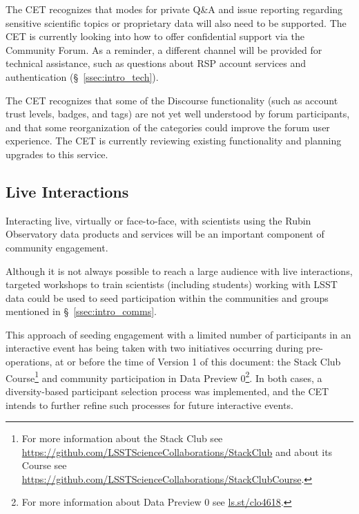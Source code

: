 \documentclass[DM,lsstdraft,toc]{lsstdoc}
\begin{document}
The CET recognizes that modes for private Q\&A and issue reporting regarding sensitive scientific topics or proprietary data will also need to be supported.
The CET is currently looking into how to offer confidential support via the Community Forum.
As a reminder, a different channel will be provided for technical assistance, such as questions about RSP account services and authentication (\S~\ref{ssec:intro_tech}).

The CET recognizes that some of the Discourse functionality (such as account trust levels, badges, and tags) are not yet well understood by forum participants, and that some reorganization of the categories could improve the forum user experience.
The CET is currently reviewing existing functionality and planning upgrades to this service.


\subsection{Live Interactions}\label{ssec:mod_interact}

Interacting live, virtually or face-to-face, with scientists using the Rubin Observatory data products and services will be an important component of community engagement.

Although it is not always possible to reach a large audience with live interactions, targeted workshops to train scientists (including students) working with LSST data could be used to seed participation within the communities and groups mentioned in \S~\ref{ssec:intro_comms}.

This approach of seeding engagement with a limited number of participants in an interactive event has being taken with two initiatives occurring during pre-operations, at or before the time of Version 1 of this document: the Stack Club Course\footnote{For more information about the Stack Club see \url{https://github.com/LSSTScienceCollaborations/StackClub} and about its Course see \url{https://github.com/LSSTScienceCollaborations/StackClubCourse}.} and community participation in Data Preview 0\footnote{For more information about Data Preview 0 see \url{ls.st/clo4618}.}.
In both cases, a diversity-based participant selection process was implemented, and the CET intends to further refine such processes for future interactive events. 
\end{document}
